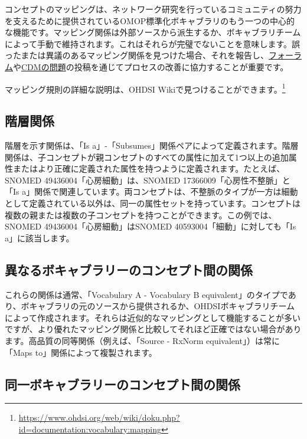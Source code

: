 \documentclass[
  11pt]{book}
\theoremstyle{definition}
\theoremstyle{definition}
\theoremstyle{definition}
\theoremstyle{definition}
\theoremstyle{remark}
\begin{document}
コンセプトのマッピングは、ネットワーク研究を行っているコミュニティの努力を支えるために提供されているOMOP標準化ボキャブラリのもう一つの中心的な機能です。マッピング関係は外部ソースから派生するか、ボキャブラリチームによって手動で維持されます。これはそれらが完璧でないことを意味します。誤ったまたは異議のあるマッピング関係を見つけた場合、それを報告し、\href{https://forums.ohdsi.org}{フォーラム}や\href{https://github.com/OHDSI/CommonDataModel/issues}{CDMの問題}の投稿を通じてプロセスの改善に協力することが重要です。

マッピング規則の詳細な説明は、OHDSI Wikiで見つけることができます。\footnote{\url{https://www.ohdsi.org/web/wiki/doku.php?id=documentation:vocabulary:mapping}}

\subsection{階層関係}\label{ux968eux5c64ux95a2ux4fc2}

階層を示す関係は、「Is a」-「Subsumes」関係ペアによって定義されます。階層関係は、子コンセプトが親コンセプトのすべての属性に加えて1つ以上の追加属性またはより正確に定義された属性を持つように定義されます。たとえば、SNOMED 49436004「心房細動」は、SNOMED 17366009「心房性不整脈」と「Is a」関係で関連しています。両コンセプトは、不整脈のタイプが一方は細動として定義されている以外は、同一の属性セットを持っています。コンセプトは複数の親または複数の子コンセプトを持つことができます。この例では、SNOMED 49436004「心房細動」はSNOMED 40593004「細動」に対しても「Is a」に該当します。

\subsection{異なるボキャブラリーのコンセプト間の関係}\label{ux7570ux306aux308bux30dcux30adux30e3ux30d6ux30e9ux30eaux30fcux306eux30b3ux30f3ux30bbux30d7ux30c8ux9593ux306eux95a2ux4fc2}

これらの関係は通常、「Vocabulary A - Vocabulary B equivalent」のタイプであり、ボキャブラリの元のソースから提供されるか、OHDSIボキャブラリチームによって作成されます。それらは近似的なマッピングとして機能することが多いですが、より優れたマッピング関係と比較してそれほど正確ではない場合があります。高品質の同等関係（例えば、「Source - RxNorm equivalent」）は常に「Maps to」関係によって複製されます。

\subsection{同一ボキャブラリーのコンセプト間の関係}\label{ux540cux4e00ux30dcux30adux30e3ux30d6ux30e9ux30eaux30fcux306eux30b3ux30f3ux30bbux30d7ux30c8ux9593ux306eux95a2ux4fc2}
\end{document}
